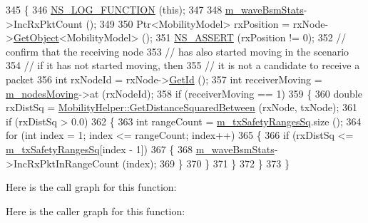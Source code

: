 \begin{DoxyCode}
345 \{
346   \hyperlink{log-macros-disabled_8h_a90b90d5bad1f39cb1b64923ea94c0761}{NS\_LOG\_FUNCTION} (\textcolor{keyword}{this});
347 
348   \hyperlink{classns3_1_1BsmApplication_afc424d5340ea34ee3099625627b8c036}{m\_waveBsmStats}->IncRxPktCount ();
349 
350   Ptr<MobilityModel> rxPosition = rxNode->\hyperlink{classns3_1_1Object_a13e18c00017096c8381eb651d5bd0783}{GetObject}<MobilityModel> ();
351   \hyperlink{assert_8h_a6dccdb0de9b252f60088ce281c49d052}{NS\_ASSERT} (rxPosition != 0);
352   \textcolor{comment}{// confirm that the receiving node}
353   \textcolor{comment}{// has also started moving in the scenario}
354   \textcolor{comment}{// if it has not started moving, then}
355   \textcolor{comment}{// it is not a candidate to receive a packet}
356   \textcolor{keywordtype}{int} rxNodeId = rxNode->\hyperlink{classns3_1_1Node_aaf49b64a843565ce3812326313b370ac}{GetId} ();
357   \textcolor{keywordtype}{int} receiverMoving = \hyperlink{classns3_1_1BsmApplication_a573c92bdce7e395c9509e3b856d8fa6c}{m\_nodesMoving}->at (rxNodeId);
358   \textcolor{keywordflow}{if} (receiverMoving == 1)
359     \{
360       \textcolor{keywordtype}{double} rxDistSq = \hyperlink{classns3_1_1MobilityHelper_a4471ab3605ba031e02ee90fc43bf8c5d}{MobilityHelper::GetDistanceSquaredBetween} 
      (rxNode, txNode);
361       \textcolor{keywordflow}{if} (rxDistSq > 0.0)
362         \{
363           \textcolor{keywordtype}{int} rangeCount = \hyperlink{classns3_1_1BsmApplication_a2e160b9460506f5d689f9a397504e13b}{m\_txSafetyRangesSq}.size ();
364           \textcolor{keywordflow}{for} (\textcolor{keywordtype}{int} index = 1; index <= rangeCount; index++)
365             \{
366               \textcolor{keywordflow}{if} (rxDistSq <= \hyperlink{classns3_1_1BsmApplication_a2e160b9460506f5d689f9a397504e13b}{m\_txSafetyRangesSq}[index - 1])
367                 \{
368                   \hyperlink{classns3_1_1BsmApplication_afc424d5340ea34ee3099625627b8c036}{m\_waveBsmStats}->IncRxPktInRangeCount (index);
369                 \}
370             \}
371         \}
372     \}
373 \}
\end{DoxyCode}


Here is the call graph for this function\+:




Here is the caller graph for this function\+:


